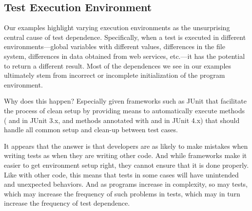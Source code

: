 
\subsection{Test Execution Environment}

Our examples highlight varying execution environments as the
unsurprising central cause of test dependence. Specifically, when a
test is executed in different environments---global variables
with different values, differences in the file system, differences in
data obtained from web services, etc.---it has the potential to return
a different result.  
%
Most of the dependences we see in our
examples ultimately stem from incorrect or incomplete initialization
of the program environment.

Why does this happen? Especially given frameworks such as
%
JUnit that facilitate the process of clean setup by providing means to
automatically execute methods ( and  in JUnit
3.x, and methods annotated with  and  in
JUnit 4.x) that should handle all common setup and clean-up between
test cases. 

It appears that the answer is that developers are as likely
to make mistakes when writing tests as when they are writing other code.
And while frameworks make it easier to get environment setup right, 
they cannot ensure that it is done properly. 
Like with other code, this means that tests in some cases will have
unintended and unexpected behaviors.  And as programs increase in complexity,
so may tests, which may increase the frequency of such problems in tests,
which may in turn increase the frequency of test dependence.


